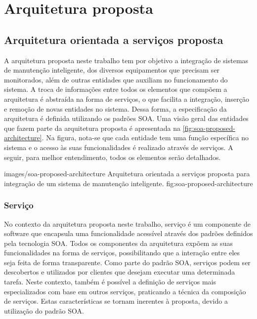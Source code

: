 \chapter{Arquitetura proposta}



\section{Arquitetura orientada a serviços proposta}

A arquitetura proposta neste trabalho tem por objetivo a integração de sistemas de manutenção
inteligente, dos diversos equipamentos que precisam ser monitorados, além de outras entidades que
auxiliam no funcionamento do sistema. A troca de informações entre todos os elementos que compõem a
arquitetura é abstraída na forma de serviços, o que facilita a integração, inserção e remoção de
novas entidades no sistema. Dessa forma, a especificação da arquitetura é definida utilizando os
padrões \gls{SOA}. Uma visão geral das entidades que fazem parte da arquitetura proposta é
apresentada na \cref{fig:soa-proposed-architecture}. Na figura, nota-se que cada entidade tem uma função específica no sistema
e o acesso às suas funcionalidades é realizado através de serviços. A seguir, para melhor
entendimento, todos os elementos serão detalhados.

    {images/soa-proposed-architecture}
    {Arquitetura orientada a serviços proposta para integração de um sistema de manutenção
        inteligente.}
    {fig:soa-proposed-architecture}


\subsection{Serviço}

No contexto da arquitetura proposta neste trabalho, serviço é um componente de software que
encapsula uma funcionalidade acessível através dos padrões definidos pela tecnologia \gls{SOA}.
Todos os componentes da arquitetura expõem as suas funcionalidades na forma de serviços,
possibilitando que a interação entre eles seja feita de forma transparente. Como parte do padrão
\gls{SOA}, serviços podem ser descobertos e utilizados por clientes que desejam executar uma
determinada tarefa. Neste contexto, também é possível a definição de serviços mais especializados
com base em outros serviços, praticando a técnica da composição de serviços. Estas características
se tornam inerentes à proposta, devido a utilização do padrão \gls{SOA}.


